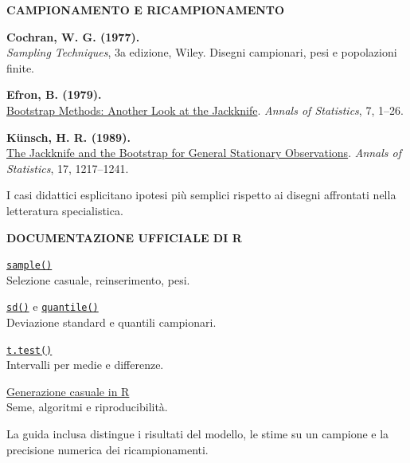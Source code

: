 \documentclass[12pt,aspectratio=1610]{beamer}
\newcommand{\PLabel}[1]{\par{\color{Classical}\bfseries\fontsize{9}{11}\selectfont\MakeUppercase{#1}}\par\vspace{1.8mm}}
\newcommand{\PBody}[1]{\par{\fontsize{11.3}{14.8}\selectfont #1\par}}
\newcommand{\PSmall}[1]{\par{\fontsize{9.8}{13.1}\selectfont #1\par}}
\newcommand{\PInfo}[1]{%
\begin{tcolorbox}[enhanced,arc=1.6mm,boxrule=.55pt,colback=GeoTint,
 colframe=Rule!80!Classical,left=2.3mm,right=2.3mm,top=2mm,bottom=2mm,
 before skip=1mm,after skip=1mm]
\PSmall{#1}\end{tcolorbox}}
\begin{document}
\begin{lrbox}{\PilotLeftBox}%
\begin{minipage}[t]{10.05cm}\raggedright\color{Ink}\fontsize{11.3}{14.8}\selectfont

\PLabel{Campionamento e ricampionamento}
\PBody{\textbf{Cochran, W. G. (1977).}\\\emph{Sampling Techniques}, 3a edizione, Wiley. Disegni campionari, pesi e popolazioni finite.}
\vspace{3mm}
\PBody{\textbf{Efron, B. (1979).}\\\href{https://doi.org/10.1214/aos/1176344552}{Bootstrap Methods: Another Look at the Jackknife}. \emph{Annals of Statistics}, 7, 1--26.}
\vspace{3mm}
\PBody{\textbf{Künsch, H. R. (1989).}\\\href{https://doi.org/10.1214/aos/1176347265}{The Jackknife and the Bootstrap for General Stationary Observations}. \emph{Annals of Statistics}, 17, 1217--1241.}
\vspace{3mm}
\PSmall{I casi didattici esplicitano ipotesi più semplici rispetto ai disegni affrontati nella letteratura specialistica.}

\end{minipage}%
\end{lrbox}
\begin{lrbox}{\PilotRightBox}%
\begin{minipage}[t]{7.55cm}\raggedright\color{Ink}\fontsize{11.3}{14.8}\selectfont

\PLabel{Documentazione ufficiale di R}
\PBody{\href{https://stat.ethz.ch/R-manual/R-devel/library/base/html/sample.html}{\texttt{sample()}}\\Selezione casuale, reinserimento, pesi.}
\vspace{3mm}
\PBody{\href{https://stat.ethz.ch/R-manual/R-devel/library/stats/html/sd.html}{\texttt{sd()}} e \href{https://stat.ethz.ch/R-manual/R-devel/library/stats/html/quantile.html}{\texttt{quantile()}}\\Deviazione standard e quantili campionari.}
\vspace{3mm}
\PBody{\href{https://stat.ethz.ch/R-manual/R-devel/library/stats/html/t.test.html}{\texttt{t.test()}}\\Intervalli per medie e differenze.}
\vspace{3mm}
\PBody{\href{https://stat.ethz.ch/R-manual/R-devel/library/base/html/Random.html}{Generazione casuale in R}\\Seme, algoritmi e riproducibilità.}
\PInfo{La guida inclusa distingue i risultati del modello, le stime su un campione e la precisione numerica dei ricampionamenti.}

\end{minipage}%
\end{lrbox}
\end{document}
